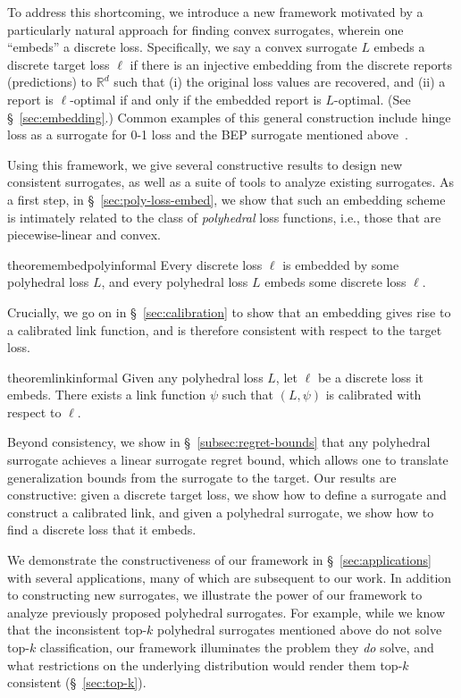 \documentclass[twoside,11pt]{article}
\newcommand{\reals}{\mathbb{R}}
\begin{document}
To address this shortcoming, we introduce a new framework motivated by a particularly natural approach for finding convex surrogates, wherein one ``embeds'' a discrete loss.
Specifically, we say a convex surrogate $L$ embeds a discrete target loss $\ell$ if there is an injective embedding from the discrete reports (predictions) to $\reals^d$ such that (i) the original loss values are recovered, and (ii) a report is $\ell$-optimal if and only if the embedded report is $L$-optimal.
(See \S~\ref{sec:embedding}.)
Common examples of this general construction include hinge loss as a surrogate for 0-1 loss and the BEP surrogate mentioned above~\citep{ramaswamy2018consistent}.

Using this framework, we give several constructive results to design new consistent surrogates, as well as a suite of tools to analyze existing surrogates.
As a first step, in \S~\ref{sec:poly-loss-embed}, we show that such an embedding scheme is intimately related to the class of \emph{polyhedral} loss functions, i.e., those that are piecewise-linear and convex.
\begin{restatable}{theorem}{embedpolyinformal}\label{thm:embed-poly-main}
  Every discrete loss $\ell$ is embedded by some polyhedral loss $L$, and every polyhedral loss $L$ embeds some discrete loss $\ell$.
\end{restatable}%
\noindent
Crucially, we go on in \S~\ref{sec:calibration} to show that an embedding gives rise to a calibrated link function, and is therefore consistent with respect to the target loss.
\begin{restatable}{theorem}{linkinformal}\label{thm:link-main}
  Given any polyhedral loss $L$, let $\ell$ be a discrete loss it embeds. There exists a link function $\psi$ such that $(L,\psi)$ is calibrated with respect to $\ell$.
\end{restatable}
\noindent
Beyond consistency, we show in \S~\ref{subsec:regret-bounds} that any polyhedral surrogate achieves a linear surrogate regret bound, which allows one to translate generalization bounds from the surrogate to the target.
Our results are constructive: given a discrete target loss, we show how to define a surrogate and construct a calibrated link, and given a polyhedral surrogate, we show how to find a discrete loss that it embeds.

We demonstrate the constructiveness of our framework in \S~\ref{sec:applications} with several applications, many of which are subsequent to our work.
In addition to constructing new surrogates, we illustrate the power of our framework to analyze previously proposed polyhedral surrogates.
For example, while we know that the inconsistent top-$k$ polyhedral surrogates mentioned above do not solve top-$k$ classification, our framework illuminates the problem they \emph{do} solve, and what restrictions on the underlying distribution would render them top-$k$ consistent (\S~\ref{sec:top-k}).
\end{document}
